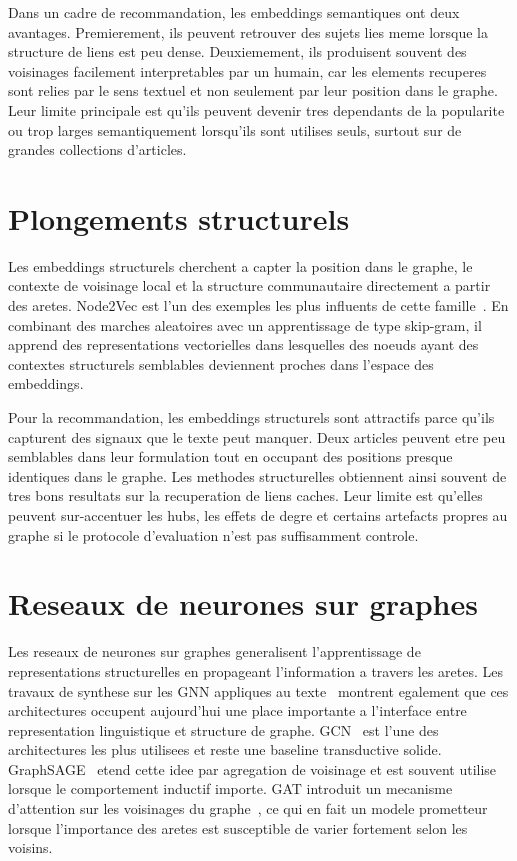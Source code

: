 Dans un cadre de recommandation, les embeddings semantiques ont deux avantages.
Premierement, ils peuvent retrouver des sujets lies meme lorsque la structure
de liens est peu dense. Deuxiemement, ils produisent souvent des voisinages
facilement interpretables par un humain, car les elements recuperes sont relies
par le sens textuel et non seulement par leur position dans le graphe. Leur
limite principale est qu'ils peuvent devenir tres dependants de la popularite
ou trop larges semantiquement lorsqu'ils sont utilises seuls, surtout sur de
grandes collections d'articles.

\section{Plongements structurels}

Les embeddings structurels cherchent a capter la position dans le graphe, le
contexte de voisinage local et la structure communautaire directement a partir
des aretes. Node2Vec est l'un des exemples les plus influents de cette
famille~\cite{grover2016node2vec}. En combinant des marches aleatoires avec un
apprentissage de type skip-gram, il apprend des representations vectorielles
dans lesquelles des noeuds ayant des contextes structurels semblables deviennent
proches dans l'espace des embeddings.

Pour la recommandation, les embeddings structurels sont attractifs parce qu'ils
capturent des signaux que le texte peut manquer. Deux articles peuvent etre peu
semblables dans leur formulation tout en occupant des positions presque
identiques dans le graphe. Les methodes structurelles obtiennent ainsi souvent
de tres bons resultats sur la recuperation de liens caches. Leur limite est
qu'elles peuvent sur-accentuer les hubs, les effets de degre et certains
artefacts propres au graphe si le protocole d'evaluation n'est pas
suffisamment controle.

\section{Reseaux de neurones sur graphes}

Les reseaux de neurones sur graphes generalisent l'apprentissage de
representations structurelles en propageant l'information a travers les aretes.
Les travaux de synthese sur les GNN appliques au texte~\cite{li2022graph}
montrent egalement que ces architectures occupent aujourd'hui une place
importante a l'interface entre representation linguistique et structure de
graphe.
GCN~\cite{kipf2017semi} est l'une des architectures les plus utilisees et reste
une baseline transductive solide. GraphSAGE~\cite{hamilton2017inductive}
etend cette idee par agregation de voisinage et est souvent utilise lorsque le
comportement inductif importe. GAT introduit un mecanisme d'attention sur les
voisinages du graphe~\cite{velickovic2018graph}, ce qui en fait un modele
prometteur lorsque l'importance des aretes est susceptible de varier fortement
selon les voisins.

